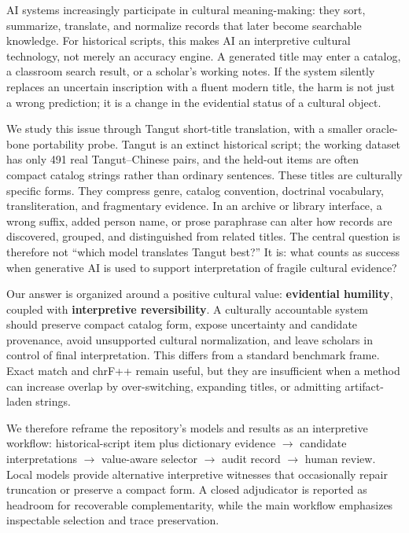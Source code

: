 \documentclass{article}
\renewcommand{\emph}[1]{{\paperitalic #1}}
\begin{document}
AI systems increasingly participate in cultural meaning-making: they sort, summarize, translate, and normalize records that later become searchable knowledge. For historical scripts, this makes AI an \emph{interpretive cultural technology}, not merely an accuracy engine. A generated title may enter a catalog, a classroom search result, or a scholar's working notes. If the system silently replaces an uncertain inscription with a fluent modern title, the harm is not just a wrong prediction; it is a change in the evidential status of a cultural object.

We study this issue through Tangut short-title translation, with a smaller oracle-bone portability probe. Tangut is an extinct historical script; the working dataset has only 491 real Tangut--Chinese pairs, and the held-out items are often compact catalog strings rather than ordinary sentences. These titles are culturally specific forms. They compress genre, catalog convention, doctrinal vocabulary, transliteration, and fragmentary evidence. In an archive or library interface, a wrong suffix, added person name, or prose paraphrase can alter how records are discovered, grouped, and distinguished from related titles. The central question is therefore not ``which model translates Tangut best?'' It is: \emph{what counts as success when generative AI is used to support interpretation of fragile cultural evidence?}

Our answer is organized around a positive cultural value: \textbf{evidential humility}, coupled with \textbf{interpretive reversibility}. A culturally accountable system should preserve compact catalog form, expose uncertainty and candidate provenance, avoid unsupported cultural normalization, and leave scholars in control of final interpretation. This differs from a standard benchmark frame. Exact match and chrF++ remain useful, but they are insufficient when a method can increase overlap by over-switching, expanding titles, or admitting artifact-laden strings.

We therefore reframe the repository's models and results as an interpretive workflow: historical-script item plus dictionary evidence $\rightarrow$ candidate interpretations $\rightarrow$ value-aware selector $\rightarrow$ audit record $\rightarrow$ human review. Local models provide alternative interpretive witnesses that occasionally repair truncation or preserve a compact form. A closed adjudicator is reported as headroom for recoverable complementarity, while the main workflow emphasizes inspectable selection and trace preservation.
\end{document}
